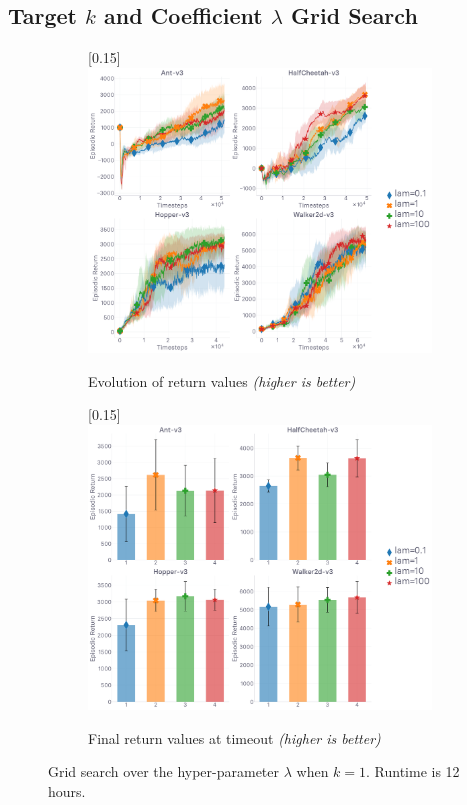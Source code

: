 \subsection{Target $k$ and Coefficient $\lambda$ Grid Search}
\label{gridklam}

\begin{figure}[H]
  \center
  \begin{subfigure}[t]{0.49\textwidth}
    \center\scalebox{0.15}[0.15]{\includegraphics{Plots/fig16_k1_lam_gs_4envs/plots_eval_env_ret_plot.pdf}}
    \caption{Evolution of return values \textit{(higher is better)}}
  \end{subfigure}
  \begin{subfigure}[t]{0.49\textwidth}
    \center\scalebox{0.15}[0.15]{\includegraphics{Plots/fig16_k1_lam_gs_4envs/plots_eval_env_ret_barplot.pdf}}
    \caption{Final return values at timeout \textit{(higher is better)}}
  \end{subfigure}
  \caption{
  Grid search over the hyper-parameter $\lambda$ when $k=1$.
  Runtime is 12 hours.}
  \label{gridk1}
\end{figure}

